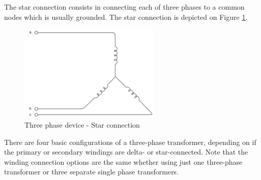 \documentclass[12pt,a4paper]{report}
\begin{document}
The star connection consists in connecting each of three phases to a common nodes which is usually grounded. The star connection is depicted on Figure \ref{fig:star}.
\begin{figure}[h]
    \centering
    \includegraphics[width=0.6\textwidth]{star.png}
    \caption{Three phase device - Star connection}
    \label{fig:star}
\end{figure}
There are four basic configurations of a three-phase transformer, depending on if the primary or secondary windings are delta- or star-connected. Note that the winding connection options are the same whether using just one three-phase transformer or three separate single phase transformers.
\end{document}
